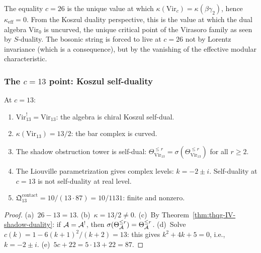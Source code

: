 \begin{remark}
\label{rem:thqg-IV-critical-string-origin}
The equality $c = 26$ is the unique value at which
$\kappa(\mathrm{Vir}_c) = \kappa(\beta\gamma_2)$, hence
$\kappa_{\mathrm{eff}} = 0$. From the Koszul duality perspective,
this is the value at which the dual algebra $\mathrm{Vir}_0$ is
uncurved, the unique critical point of the Virasoro family
as seen by $S$-duality. The bosonic string is forced to live
at $c = 26$ not by Lorentz invariance (which is a consequence),
but by the vanishing of the effective modular characteristic.
\end{remark}

\subsubsection{The \texorpdfstring{$c = 13$}{c = 13} point:
Koszul self-duality}

\begin{proposition}[The $c = 13$ chiral Koszul self-dual point; \ClaimStatusProvedHere]
\label{prop:thqg-IV-c13}
At $c = 13$:
\begin{enumerate}[label=\textup{(\alph*)}]
\item $\mathrm{Vir}_{13}^! = \mathrm{Vir}_{13}$: the algebra is
 chiral Koszul self-dual.
\item $\kappa(\mathrm{Vir}_{13}) = 13/2$: the bar complex is curved.
\item The shadow obstruction tower is self-dual:
 $\Theta_{\mathrm{Vir}_{13}}^{\leq r} = \sigma(\Theta_{\mathrm{Vir}_{13}}^{\leq r})$
 for all $r \geq 2$.
\item The Liouville parametrization gives complex levels:
 $k = -2 \pm i$. Self-duality at $c = 13$ is not
 self-duality at real level.
\item $\mathfrak{Q}^{\mathrm{contact}}_{13} = 10/(13 \cdot 87)
 = 10/1131$: finite and nonzero.
\end{enumerate}
\end{proposition}

\begin{proof}
(a)~$26 - 13 = 13$.
(b)~$\kappa = 13/2 \neq 0$.
(c)~By Theorem~\ref{thm:thqg-IV-shadow-duality}: if $\mathcal{A} = \mathcal{A}^!$,
then $\sigma(\Theta_{\mathcal{A}}^{\leq r}) = \Theta_{\mathcal{A}}^{\leq r}$.
(d)~Solve $c(k) = 1 - 6(k+1)^2/(k+2) = 13$: this gives
$k^2 + 4k + 5 = 0$, i.e., $k = -2 \pm i$.
(e)~$5c + 22 = 5 \cdot 13 + 22 = 87$.
\end{proof}

